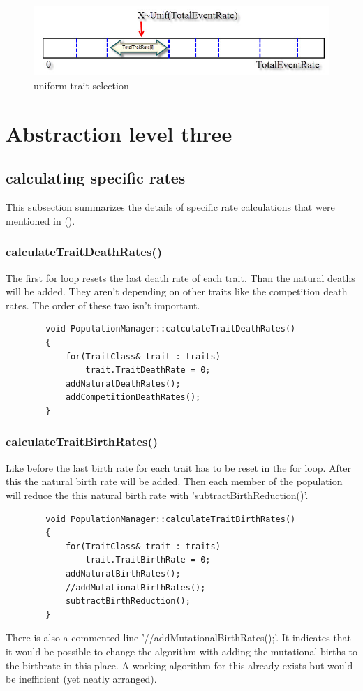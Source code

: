 \documentclass[a4paper,10pt]{scrartcl}
\begin{document}
	\begin{figure}
		\centering
		\includegraphics[width=1\linewidth]{Bilder/SelectTrait}
		\caption{uniform trait selection}
		\label{fig:SelectTrait}
	\end{figure}
	
\section{Abstraction level three}
	\subsection{calculating specific rates}
	This subsection summarizes the details of specific rate calculations that were mentioned in ().
		\subsubsection{calculateTraitDeathRates()}
		The first for loop resets the last death rate of each trait. Than the natural deaths will be added. They aren't depending on other traits like the competition death rates. The order of these two isn't important.
		\begin{lstlisting} 
		void PopulationManager::calculateTraitDeathRates()
		{
		    for(TraitClass& trait : traits)
		        trait.TraitDeathRate = 0;
		    addNaturalDeathRates();
		    addCompetitionDeathRates();
		}
		\end{lstlisting}
		
		\subsubsection{calculateTraitBirthRates()}
		Like before the last birth rate for each trait has to be reset in the for loop. After this the natural birth rate will be added. Then each member of the population will reduce the this natural birth rate with 'subtractBirthReduction()'.
		\begin{lstlisting} 
		void PopulationManager::calculateTraitBirthRates()
		{
		    for(TraitClass& trait : traits)
		        trait.TraitBirthRate = 0;
		    addNaturalBirthRates();
		    //addMutationalBirthRates();
		    subtractBirthReduction();
		}
		\end{lstlisting}
		There is also a commented line '//addMutationalBirthRates();'. It indicates that it would be possible to change the algorithm with adding the mutational births to the birthrate in this place. A working algorithm for this already exists but would be inefficient (yet neatly arranged).
		
\end{document}
